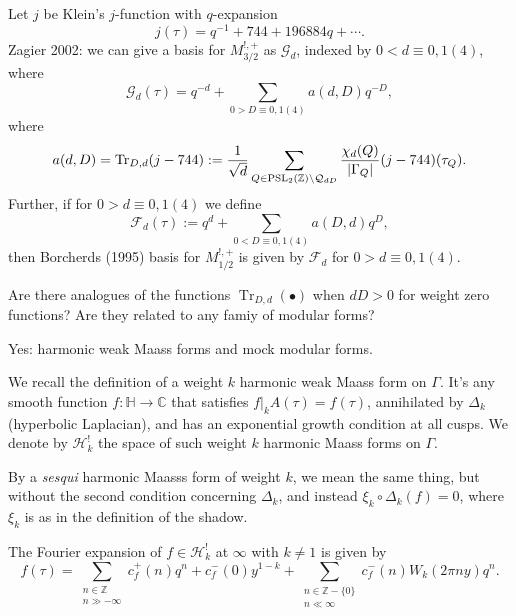 \documentclass[reqno]{amsart} 
\begin{document}
Let $j$ be Klein's $j$-function with $q$-expansion
\begin{equation*}
  j(\tau) = q^{-1} + 744 + 196884q + \dotsb.
\end{equation*}
Zagier 2002: we can give a basis for $M_{3/2}^{!, +}$ as $\mathcal{G}_d$, indexed by $0 < d \equiv 0, 1(4)$, where
\begin{equation*}
  \mathcal{G}_d(\tau) = q^{- d} + \sum_{0 > D \equiv 0, 1 (4)} a(d, D) q^{- D},
\end{equation*}
where
\begin{equation*}
  a(d, D) = \operatorname{Tr}_{D, d}(j - 744)
  := \frac{1}{\sqrt{d}}
  \sum_{Q \in \operatorname{PSL}_2(\mathbb{Z}) \backslash \mathcal{Q}_{d D}}
  \frac{\chi_d(Q)}{ \lvert \Gamma_Q \rvert}(j - 744)(\tau_Q).
\end{equation*}
Further, if for $0 > d \equiv 0, 1(4)$ we define
\begin{equation*}
  \mathcal{F}_d(\tau) := q^d + \sum_{0 < D \equiv 0 , 1(4)} a(D, d) q^D,
\end{equation*}
then Borcherds (1995) basis for $M_{1/2}^{!, +}$ is given by $\mathcal{F}_d$ for $0 > d \equiv 0,1(4)$.

\begin{question}
  Are there analogues of the functions $\operatorname{Tr}_{D, d}(\bullet)$ when $d D > 0$ for weight zero functions?  Are they related to any famiy of modular forms?
\end{question}
\begin{answer}
  Yes:  harmonic weak Maass forms and mock modular forms.
\end{answer}

We recall the definition of a weight $k$ harmonic weak Maass form on $\Gamma$.  It's any smooth function $f : \mathbb{H} \rightarrow \mathbb{C}$ that satisfies $f |_k A(\tau) = f(\tau)$, annihilated by $\Delta_k$ (hyperbolic Laplacian), and has an exponential growth condition at all cusps.  We denote by $\mathcal{H}_k ^!$ the space of such weight $k$ harmonic Maass forms on $\Gamma$.

By a \emph{sesqui} harmonic Maasss form of weight $k$, we mean the same thing, but without the second condition concerning $\Delta_k$, and instead $\xi_k \circ \Delta_k(f) = 0$, where $\xi_k$ is as in the definition of the shadow.

The Fourier expansion of $f \in \mathcal{H}_k ^!$ at $\infty$ with $k \neq 1$ is given by
\begin{equation*}
  f(\tau) = \sum_{
    \substack{
      n \in \mathbb{Z}  \\
      n \gg - \infty
    }
  } c_f^+(n) q^n + c_f^-(0) y^{1 - k}
  + \sum_{
    \substack{
      n \in \mathbb{Z} - \{0\}  \\
      n \ll \infty
    }
  } c_f^-(n)
  W_k(2 \pi n y) q^n.
\end{equation*}
\end{document}
